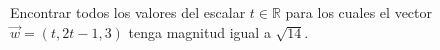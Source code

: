 Encontrar todos los valores del escalar $t \in \mathbb{R}$ para los cuales el vector $\vec{w} = (t, 2t-1, 3)$ tenga magnitud igual a $\sqrt{14}$.